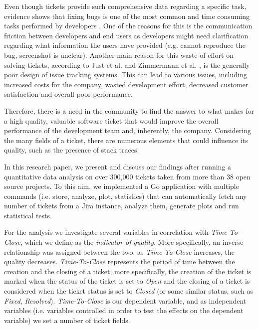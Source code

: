 \documentclass{mpaper}
\begin{document}
Even though tickets provide such comprehensive data regarding a specific task, evidence shows 
that fixing bugs is one of the most common and time consuming tasks performed by developers \cite{latoza2006maintaining}. One of
the reasons for this is the communication friction between developers and end users \cite{Korkala2014WasteIdentification}
as developers might need clarification regarding what information the users have provided (e.g. cannot reproduce the bug, 
screenshot is unclear). Another main reason for this waste of effort on solving tickets, according to 
Just et al. \cite{just2008towards} and Zimmermann et al. \cite{zimmermann2009improving}, is the generally poor design of issue 
tracking systems. This can lead to various issues, including increased costs for the company, wasted development effort, 
decreased customer satisfaction and overall poor performance.

Therefore, there is a need in the community to find the answer to what makes for a high quality, valuable software ticket 
that would improve the overall performance of the development team and, inherently, the company. Considering the many fields of 
a ticket, there are numerous elements that could influence its quality, such as the presence of stack traces.

In this research paper, we present and discuss our findings after running a quantitative data analysis 
on over 300,000 tickets taken from more than 38 open source projects. To this aim, we implemented a Go application 
with multiple commands (i.e. store, analyze, plot, statistics) that can automatically fetch any number of tickets 
from a Jira instance, analyze them, generate plots and run statistical tests. 

For the analysis we investigate several variables in correlation with \emph{Time-To-Close}, 
which we define as the \emph{indicator of quality}. More specifically, an inverse relationship was assigned between the 
two: as \emph{Time-To-Close} increases, the quality decreases. \emph{Time-To-Close} represents the period of time between the creation 
and the closing of a ticket; more specifically, the creation of the ticket is marked when the status of the ticket is set to 
\emph{Open} and the closing of a ticket is considered when the ticket status is set to \emph{Closed} (or some similar status, 
such as \emph{Fixed}, \emph{Resolved}). \emph{Time-To-Close} is our dependent variable, and as independent variables 
(i.e. variables controlled in order to test the effects on the dependent variable) we set a number of ticket fields. 
\end{document}
